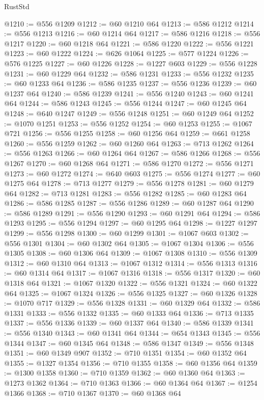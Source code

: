 \begin{lexlean}{RustStd}
\begin{coremodule}
{\begin{coremodule}
{{{{{{{{{{{{{{{{{{{{{{{{{{{{{@1210 := @556 @1209
@1212 := @60 @1210 @64
@1213 := @586 @1212
@1214 := @556 @1213
@1216 := @60 @1214 @64
@1217 := @586 @1216
@1218 := @556 @1217
@1220 := @60 @1218 @64
@1221 := @586 @1220
@1222 := @556 @1221
@1223 := @60 @1222
@1224 := @626 @1064
@1225 := @577 @1224
@1226 := @576 @1225
@1227 := @60 @1226
@1228 := @1227 @603
@1229 := @556 @1228
@1231 := @60 @1229 @64
@1232 := @586 @1231
@1233 := @556 @1232
@1235 := @60 @1233 @64
@1236 := @586 @1235
@1237 := @556 @1236
@1239 := @60 @1237 @64
@1240 := @586 @1239
@1241 := @556 @1240
@1243 := @60 @1241 @64
@1244 := @586 @1243
@1245 := @556 @1244
@1247 := @60 @1245 @64
@1248 := @640 @1247
@1249 := @556 @1248
@1251 := @60 @1249 @64
@1252 := @1070 @1251
@1253 := @556 @1252
@1254 := @60 @1253
@1255 := @1067 @721
@1256 := @556 @1255
@1258 := @60 @1256 @64
@1259 := @661 @1258
@1260 := @556 @1259
@1262 := @60 @1260 @64
@1263 := @713 @1262
@1264 := @556 @1263
@1266 := @60 @1264 @64
@1267 := @586 @1266
@1268 := @556 @1267
@1270 := @60 @1268 @64
@1271 := @586 @1270
@1272 := @556 @1271
@1273 := @60 @1272
@1274 := @640 @603
@1275 := @556 @1274
@1277 := @60 @1275 @64
@1278 := @713 @1277
@1279 := @556 @1278
@1281 := @60 @1279 @64
@1282 := @713 @1281
@1283 := @556 @1282
@1285 := @60 @1283 @64
@1286 := @586 @1285
@1287 := @556 @1286
@1289 := @60 @1287 @64
@1290 := @586 @1289
@1291 := @556 @1290
@1293 := @60 @1291 @64
@1294 := @586 @1293
@1295 := @556 @1294
@1297 := @60 @1295 @64
@1298 := @1227 @1297
@1299 := @556 @1298
@1300 := @60 @1299
@1301 := @1067 @603
@1302 := @556 @1301
@1304 := @60 @1302 @64
@1305 := @1067 @1304
@1306 := @556 @1305
@1308 := @60 @1306 @64
@1309 := @1067 @1308
@1310 := @556 @1309
@1312 := @60 @1310 @64
@1313 := @1067 @1312
@1314 := @556 @1313
@1316 := @60 @1314 @64
@1317 := @1067 @1316
@1318 := @556 @1317
@1320 := @60 @1318 @64
@1321 := @1067 @1320
@1322 := @556 @1321
@1324 := @60 @1322 @64
@1325 := @1067 @1324
@1326 := @556 @1325
@1327 := @60 @1326
@1328 := @1070 @717
@1329 := @556 @1328
@1331 := @60 @1329 @64
@1332 := @586 @1331
@1333 := @556 @1332
@1335 := @60 @1333 @64
@1336 := @713 @1335
@1337 := @556 @1336
@1339 := @60 @1337 @64
@1340 := @586 @1339
@1341 := @556 @1340
@1343 := @60 @1341 @64
@1344 := @654 @1343
@1345 := @556 @1344
@1347 := @60 @1345 @64
@1348 := @586 @1347
@1349 := @556 @1348
@1351 := @60 @1349 @907
@1352 := @710 @1351
@1354 := @60 @1352 @64
@1355 := @1327 @1354
@1356 := @710 @1355
@1358 := @60 @1356 @64
@1359 := @1300 @1358
@1360 := @710 @1359
@1362 := @60 @1360 @64
@1363 := @1273 @1362
@1364 := @710 @1363
@1366 := @60 @1364 @64
@1367 := @1254 @1366
@1368 := @710 @1367
@1370 := @60 @1368 @64
}}}}}}}}}}}}}}}}}}}}}}}}}}}}}
\end{coremodule}}
\end{coremodule}
\end{lexlean}
